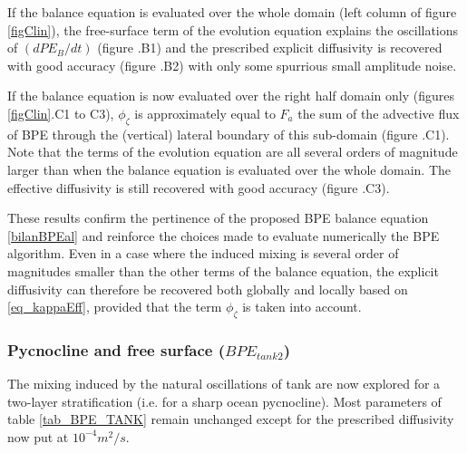 If the balance equation is evaluated over the whole domain (left column of figure \ref{figClin}), the free-surface term of the evolution equation explains the oscillations of $(dPE_B/dt)$ (figure .B1) and the prescribed explicit diffusivity is recovered with good accuracy (figure .B2) with only some spurrious small amplitude noise.

If the balance equation is now evaluated over the right half domain only (figures \ref{figClin}.C1 to C3), $\phi_{\zeta}$ is approximately equal to $F_a$ the sum of the advective flux of BPE through the (vertical) lateral boundary of this sub-domain (figure .C1). Note that the terms of the evolution equation are all several orders of magnitude larger than when the balance equation is evaluated over the whole domain. The effective diffusivity is still recovered with good accuracy (figure .C3).

These results confirm the pertinence of the proposed BPE balance equation \ref{bilanBPEal} and reinforce the choices made to evaluate numerically the BPE algorithm. Even in a case where the induced mixing is several order of magnitudes smaller than the other terms of the balance equation, the explicit diffusivity can therefore be recovered both globally and locally based on \ref{eq_kappaEff}, provided that the term $\phi_{\zeta}$ is taken into account.

\subsubsection{Pycnocline and free surface ({$BPE_{tank2}$})}
The mixing induced by the natural oscillations of tank are now explored for a two-layer stratification (i.e. for a sharp ocean pycnocline). Most parameters of table \ref{tab_BPE_TANK} remain unchanged except for the prescribed diffusivity now put at $10^{-4}m^2/s$.

